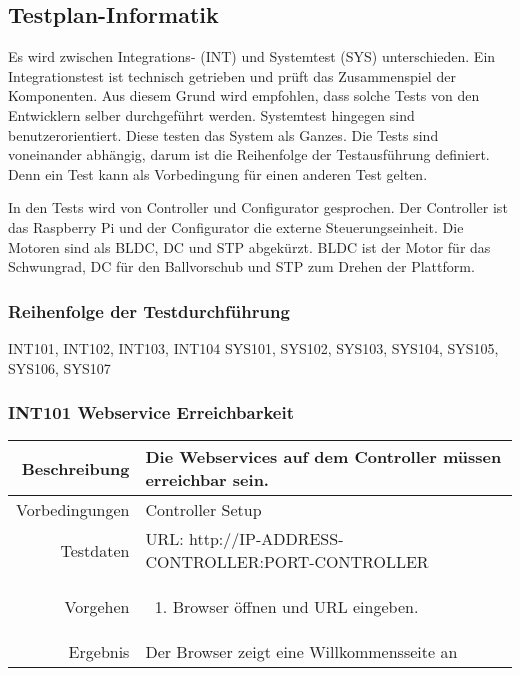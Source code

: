 \subsection{Testplan-Informatik}

Es wird zwischen Integrations- (INT) und Systemtest (SYS) unterschieden. Ein Integrationstest
ist technisch getrieben und prüft das Zusammenspiel der Komponenten. Aus diesem
Grund wird empfohlen, dass solche Tests von den Entwicklern selber durchgeführt werden.
Systemtest hingegen sind benutzerorientiert. Diese testen das System als Ganzes.
Die Tests sind voneinander abhängig, darum ist die Reihenfolge der Testausführung
definiert. Denn ein Test kann als Vorbedingung für einen anderen Test gelten. 

In den Tests wird von Controller und Configurator gesprochen. Der Controller ist
das Raspberry Pi und der Configurator die externe Steuerungseinheit.
Die Motoren sind als BLDC, DC und STP abgekürzt.
BLDC ist der Motor für das Schwungrad, DC für den Ballvorschub und STP zum Drehen der Plattform.

\subsubsection{Reihenfolge der Testdurchführung}
INT101, INT102, INT103, INT104
SYS101, SYS102, SYS103, SYS104, SYS105, SYS106, SYS107




\subsubsection{INT101 Webservice Erreichbarkeit}
\begin{table}[h!]
	\renewcommand{\arraystretch}{1.5}
	\begin{tabular}{|r|p{14cm}|}
		\hline Beschreibung & Die Webservices auf dem Controller müssen erreichbar sein. \\ 
		\hline Vorbedingungen & Controller Setup \\ 
		\hline Testdaten & URL: http://IP-ADDRESS-CONTROLLER:PORT-CONTROLLER \\ 
		\hline Vorgehen & 
		\begin{enumerate}
			\item Browser öffnen und URL eingeben.
		\end{enumerate} \\ 
		\hline Ergebnis & Der Browser zeigt eine Willkommensseite an \\ 
		\hline 
	\end{tabular}
\end{table}

